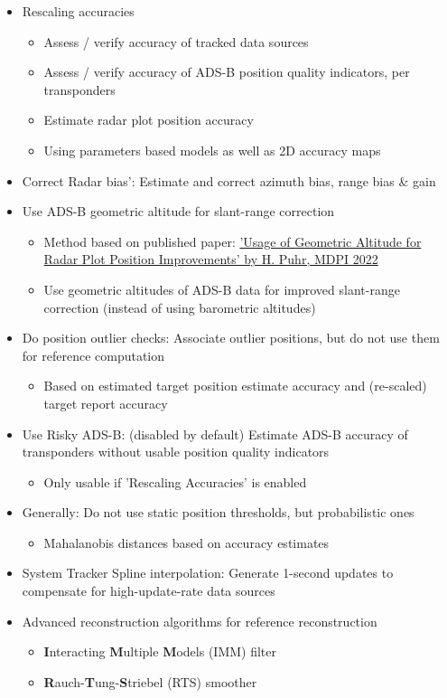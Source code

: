 \begin{itemize}
\begin{itemize}
\item Rescaling accuracies
\begin{itemize}
\item Assess / verify accuracy of tracked data sources
\item Assess / verify accuracy of ADS-B position quality indicators, per transponders
\item Estimate radar plot position accuracy
\item Using parameters based models as well as 2D accuracy maps
\end{itemize}
\item Correct Radar bias': Estimate and correct azimuth bias, range bias \& gain
\item Use ADS-B geometric altitude for slant-range correction
\begin{itemize}
\item Method based on published paper: \href{https://doi.org/10.3390/engproc2022028008}{'Usage of Geometric Altitude for Radar Plot Position Improvements' by H. Puhr, MDPI 2022}
\item Use geometric altitudes of ADS-B data for improved slant-range correction (instead of using barometric altitudes)
\end{itemize}
\item Do position outlier checks: Associate outlier positions, but do not use them for reference computation
\begin{itemize}
\item Based on estimated target position estimate accuracy and (re-scaled) target report accuracy
\end{itemize}
\item Use Risky ADS-B: (disabled by default) Estimate ADS-B accuracy of transponders without usable position quality indicators
\begin{itemize}
\item Only usable if 'Rescaling Accuracies' is enabled
\end{itemize}
\item Generally: Do not use static position thresholds, but probabilistic ones
\begin{itemize}
\item Mahalanobis distances based on accuracy estimates
\end{itemize}
\item System Tracker Spline interpolation: Generate 1-second updates to compensate for high-update-rate data sources
\item Advanced reconstruction algorithms for reference reconstruction
\begin{itemize}
\item \textbf{I}nteracting \textbf{M}ultiple \textbf{M}odels (IMM) filter
\item \textbf{R}auch-\textbf{T}ung-\textbf{S}triebel (RTS) smoother
\end{itemize}
\end{itemize}



\end{itemize}
